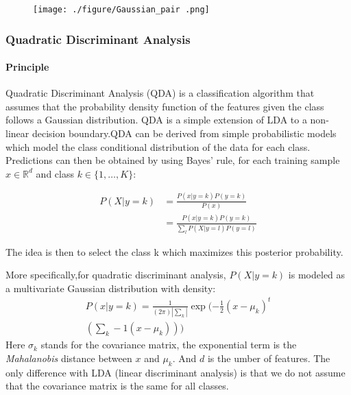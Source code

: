 \documentclass[11pt,a4paper]{report}
\begin{document}
\begin{figure}[H]
    \centering
    \texttt{[image: ./figure/Gaussian\_pair .png]}
\end{figure}
\begin{multicols}{2}
    \subsubsection{Quadratic Discriminant Analysis}
    \paragraph{Principle}
    Quadratic Discriminant Analysis (QDA) \cite{qda} is a classification algorithm that assumes that the probability density function of the features given the class follows a Gaussian distribution.
    QDA is a simple extension of LDA to a non-linear decision boundary.QDA can be derived from simple probabilistic models which model the class conditional distribution of the data
    for each class. Predictions can then be obtained by using Bayes’ rule, for each training sample $x \in \mathbb{R}^d$ and class $k \in \{1, \dots, K\}$:

    \begin{align*}
        P(X|y=k) & = \frac{P(x|y =k)P(y=k)}{P(x)}                        \\
                 & = \frac{P(x|y = k)P(y = k)}{\sum_lP(X|y = l)P(y = l)}
    \end{align*}


    The idea is then to select the class k which maximizes this posterior probability.

    More specifically,for quadratic discriminant analysis, $P(X|y = k)$
    is modeled as a multivariate Gaussian distribution with density:
    \begin{multline*}
        P(x|y = k) = \frac{1}{(2\pi)|\sum_k|}\exp(-\tfrac{1}{2}(x - \mu_k)^t \\
        (\sum_k-1(x - \mu_k)))
    \end{multline*}
    Here $\sigma_k$ stands for the covariance matrix, the exponential term is the \emph{Mahalanobis} distance between $x$ and $\mu_k$. And $d$ is the umber of features. The only difference with LDA (linear discriminant analysis) is that we do not assume that the covariance matrix is the same for all classes.

\end{multicols}
\end{document}
